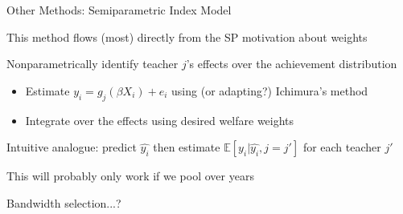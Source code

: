 \documentclass[t,aspectratio=169,11pt]{beamer}
\newenvironment{wideitemize}{\itemize\addtolength{\itemsep}{14pt}}{\enditemize}
\begin{document}
\begin{frame}{Other Methods: Semiparametric Index Model}

\begin{wideitemize}

    \item This method flows (most) directly from the SP motivation about weights
    
    \item  Nonparametrically identify teacher $j$'s effects over the achievement distribution
    \begin{itemize}
        \item Estimate $y_i = g_j(\beta X_i) +e_i$ using (or adapting?) Ichimura's method \citep{ichimura1993semiparametric}
        \item Integrate over the effects using desired welfare weights
    \end{itemize}
    
    \item Intuitive analogue: predict $\hat{y_i}$ then estimate $\mathbb{E}[y_i|\hat{y_i},j=j']$ for each teacher $j'$

    \item This will probably only work if we pool over years
    \item Bandwidth selection...? 

\end{wideitemize}

\vfill
\begin{flushleft}

\hyperlink{next}{}
\end{flushleft}
\end{frame}
\end{document}
